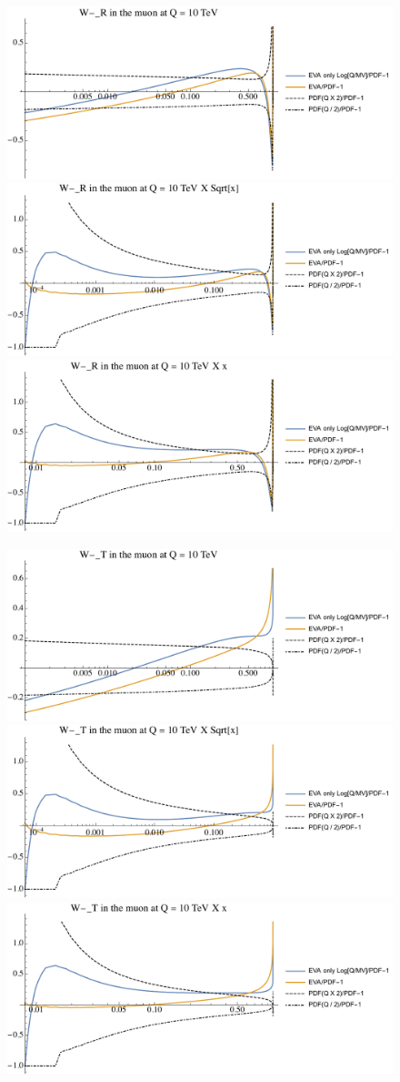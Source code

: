 \documentclass[a4paper,11pt]{article}
\begin{document}
\begin{figure}[ht]
\includegraphics[width=0.46\linewidth]{Notebooks/PlotPDFs/ratios/10TeV/W-_R_Q.pdf}
\includegraphics[width=0.46\linewidth]{Notebooks/PlotPDFs/ratios/10TeV/W-_R_Qsqrtx.pdf}
\includegraphics[width=0.46\linewidth]{Notebooks/PlotPDFs/ratios/10TeV/W-_R_Qx.pdf}
\end{figure}

\begin{figure}[ht]
\includegraphics[width=0.46\linewidth]{Notebooks/PlotPDFs/ratios/10TeV/W-_T_Q.pdf}
\includegraphics[width=0.46\linewidth]{Notebooks/PlotPDFs/ratios/10TeV/W-_T_Qsqrtx.pdf}
\includegraphics[width=0.46\linewidth]{Notebooks/PlotPDFs/ratios/10TeV/W-_T_Qx.pdf}
\end{figure}
\end{document}
